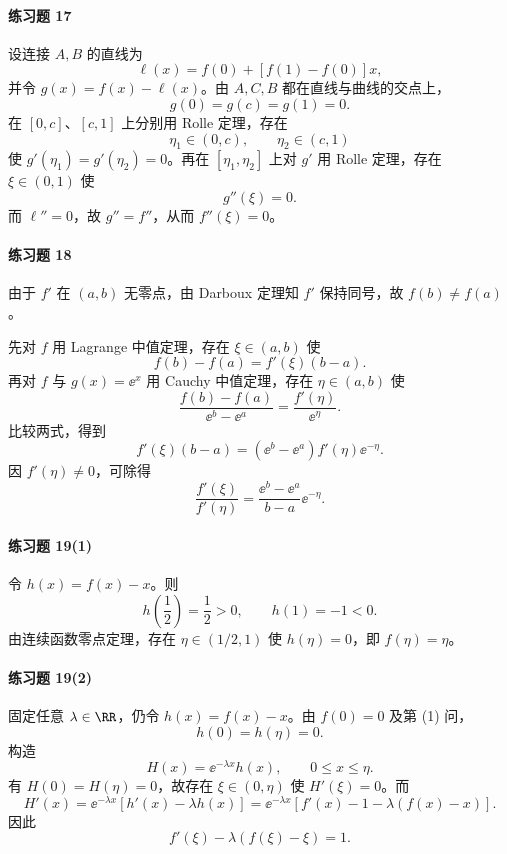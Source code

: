 \paragraph{练习题 17}
\begin{xsolution}
设连接 $A,B$ 的直线为
\[
  \ell(x)=f(0)+[f(1)-f(0)]x,
\]
并令 $g(x)=f(x)-\ell(x)$。由 $A,C,B$ 都在直线与曲线的交点上，
\[
  g(0)=g(c)=g(1)=0.
\]
在 $[0,c]$、$[c,1]$ 上分别用 Rolle 定理，存在
\[
  \eta_1\in(0,c),\qquad \eta_2\in(c,1)
\]
使 $g'(\eta_1)=g'(\eta_2)=0$。再在 $[\eta_1,\eta_2]$ 上对 $g'$ 用 Rolle 定理，存在 $\xi\in(0,1)$ 使
\[
  g''(\xi)=0.
\]
而 $\ell''=0$，故 $g''=f''$，从而 $f''(\xi)=0$。
\end{xsolution}

\paragraph{练习题 18}
\begin{xsolution}
由于 $f'$ 在 $(a,b)$ 无零点，由 Darboux 定理知 $f'$ 保持同号，故 $f(b)\neq f(a)$。

先对 $f$ 用 Lagrange 中值定理，存在 $\xi\in(a,b)$ 使
\[
  f(b)-f(a)=f'(\xi)(b-a).
\]
再对 $f$ 与 $g(x)=\ee^x$ 用 Cauchy 中值定理，存在 $\eta\in(a,b)$ 使
\[
  \frac{f(b)-f(a)}{\ee^b-\ee^a}
  =\frac{f'(\eta)}{\ee^\eta}.
\]
比较两式，得到
\[
  f'(\xi)(b-a)
  =(\ee^b-\ee^a)f'(\eta)\ee^{-\eta}.
\]
因 $f'(\eta)\neq0$，可除得
\[
  \frac{f'(\xi)}{f'(\eta)}
  =\frac{\ee^b-\ee^a}{b-a}\ee^{-\eta}.
\]
\end{xsolution}

\paragraph{练习题 19(1)}
\begin{xsolution}
令 $h(x)=f(x)-x$。则
\[
  h\left(\frac12\right)=\frac12>0,
  \qquad
  h(1)=-1<0.
\]
由连续函数零点定理，存在 $\eta\in(1/2,1)$ 使 $h(\eta)=0$，即 $f(\eta)=\eta$。
\end{xsolution}

\paragraph{练习题 19(2)}
\begin{xsolution}
固定任意 $\lambda\in\RR$，仍令 $h(x)=f(x)-x$。由 $f(0)=0$ 及第 (1) 问，
\[
  h(0)=h(\eta)=0.
\]
构造
\[
  H(x)=\ee^{-\lambda x}h(x),\qquad0\leqslant x\leqslant\eta.
\]
有 $H(0)=H(\eta)=0$，故存在 $\xi\in(0,\eta)$ 使 $H'(\xi)=0$。而
\[
  H'(x)=\ee^{-\lambda x}[h'(x)-\lambda h(x)]
  =\ee^{-\lambda x}[f'(x)-1-\lambda(f(x)-x)].
\]
因此
\[
  f'(\xi)-\lambda(f(\xi)-\xi)=1.
\]
\end{xsolution}

